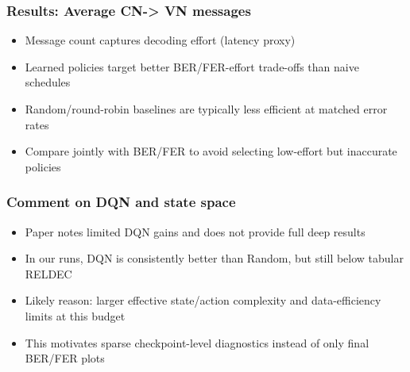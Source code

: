 \documentclass{beamer}
\begin{document}


\begin{frame}
\frametitle{Results: Average CN-> VN messages}

\begin{itemize}
    \item Message count captures decoding effort (latency proxy)
    \item Learned policies target better BER/FER-effort trade-offs than naive schedules
    \item Random/round-robin baselines are typically less efficient at matched error rates
    \item Compare jointly with BER/FER to avoid selecting low-effort but inaccurate policies
\end{itemize}

\end{frame}



\begin{frame}
\frametitle{Comment on DQN and state space}

\begin{itemize}
    \item Paper notes limited DQN gains and does not provide full deep results
    \item In our runs, DQN is consistently better than Random, but still below tabular RELDEC
    \item Likely reason: larger effective state/action complexity and data-efficiency limits at this budget
    \item This motivates sparse checkpoint-level diagnostics instead of only final BER/FER plots
\end{itemize}

\end{frame}


\end{document}
